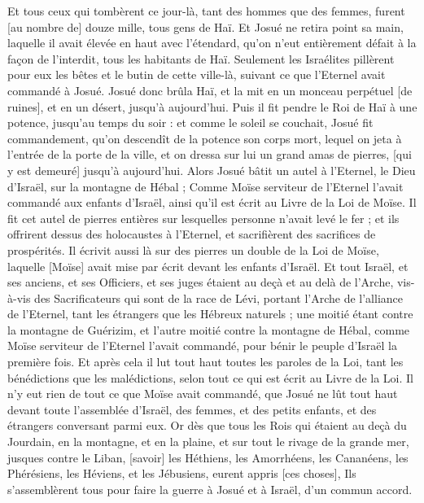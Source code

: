 \begin{multicols}{2}
Et tous ceux qui tombèrent ce jour-là, tant des hommes que des femmes, furent [au nombre de] douze mille, tous gens de Haï.
Et Josué ne retira point sa main, laquelle il avait élevée en haut avec l'étendard, qu'on n'eut entièrement défait à la façon de l'interdit, tous les habitants de Haï.
Seulement les Israélites pillèrent pour eux les bêtes et le butin de cette ville-là, suivant ce que l'Eternel avait commandé à Josué.
Josué donc brûla Haï, et la mit en un monceau perpétuel [de ruines], et en un désert, jusqu'à aujourd'hui.
Puis il fit pendre le Roi de Haï à une potence, jusqu'au temps du soir : et comme le soleil se couchait, Josué fit commandement, qu'on descendît de la potence son corps mort, lequel on jeta à l'entrée de la porte de la ville, et on dressa sur lui un grand amas de pierres, [qui y est demeuré] jusqu'à aujourd'hui.
Alors Josué bâtit un autel à l'Eternel, le Dieu d'Israël, sur la montagne de Hébal ;
Comme Moïse serviteur de l'Eternel l'avait commandé aux enfants d'Israël, ainsi qu'il est écrit au Livre de la Loi de Moïse. Il fit cet autel de pierres entières sur lesquelles personne n'avait levé le fer ; et ils offrirent dessus des holocaustes à l'Eternel, et sacrifièrent des sacrifices de prospérités.
Il écrivit aussi là sur des pierres un double de la Loi de Moïse, laquelle [Moïse] avait mise par écrit devant les enfants d'Israël.
Et tout Israël, et ses anciens, et ses Officiers, et ses juges étaient au deçà et au delà de l'Arche, vis-à-vis des Sacrificateurs qui sont de la race de Lévi, portant l'Arche de l'alliance de l'Eternel, tant les étrangers que les Hébreux naturels ; une moitié étant contre la montagne de Guérizim, et l'autre moitié contre la montagne de Hébal, comme Moïse serviteur de l'Eternel l'avait commandé, pour bénir le peuple d'Israël la première fois.
Et après cela il lut tout haut toutes les paroles de la Loi, tant les bénédictions que les malédictions, selon tout ce qui est écrit au Livre de la Loi.
Il n'y eut rien de tout ce que Moïse avait commandé, que Josué ne lût tout haut devant toute l'assemblée d'Israël, des femmes, et des petits enfants, et des étrangers conversant parmi eux.
\VerseOne{}Or dès que tous les Rois qui étaient au deçà du Jourdain, en la montagne, et en la plaine, et sur tout le rivage de la grande mer, jusques contre le Liban, [savoir] les Héthiens, les Amorrhéens, les Cananéens, les Phérésiens, les Héviens, et les Jébusiens, eurent appris [ces choses],
Ils s'assemblèrent tous pour faire la guerre à Josué et à Israël, d'un commun accord.

\end{multicols}
